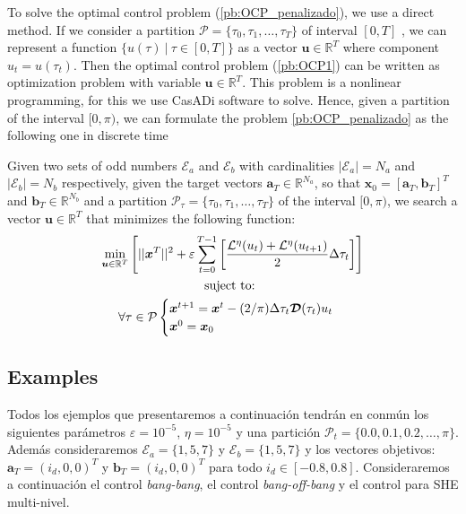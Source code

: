 \documentclass[twocolumn]{autart}    %
\begin{document}
To solve the optimal control problem (\ref{pb:OCP_penalizado}), we use a direct method. 
%
If we consider a partition $\mathcal{P} = \{\tau_0,\tau_1,\dots,\tau_{T}\}$ of interval $[0,T]$ , we can represent a function $\{ u(\tau) \ | \ \tau \in [0,T]\}$ as a vector $\bm{u} \in \mathbb{R}^{T}$ where component $u_t = u(\tau_t)$.  
%
Then the optimal control problem (\ref{pb:OCP1}) can be written as optimization problem with variable $\bm{u} \in \mathbb{R}^{T}$. This problem is a nonlinear programming, for this we use CasADi software to solve. 
%
Hence, given a partition of the interval $[0,\pi)$, we can formulate the problem \ref{pb:OCP_penalizado} as the following one in discrete time
\newline

\begin{problem}\label{pb:numOCP2}
Given two sets of odd numbers $\mathcal{E}_a$ and $\mathcal{E}_b$ with cardinalities $|\mathcal{E}_a| = N_a$ and $|\mathcal{E}_b| = N_b$ respectively, given the target vectors $\bm{a}_T  \in \mathbb{R}^{N_a}$, so that $\bm{x}_0 = [\bm{a}_T,\bm{b}_T]^T$ and $\bm{b}_T \in \mathbb{R}^{N_b}$ and a partition $\mathcal{P}_\tau = \{\tau_0,\tau_1,\dots,\tau_{T}\}$ of the interval $[0,\pi)$, we search a vector $\bm{u} \in \mathbb{R}^{T}$ that minimizes the following function:
\begin{gather}
        \min_{\bm{u} \in \mathbb{R}^{T} } 
        \Bigg[ 
        || \bm{x}^{T}||^2
        + \varepsilon  
        \sum_{t=0}^{T-1} 
            \bigg[ \frac{\mathcal{L}^\eta(u_{t}) + \mathcal{L}^\eta(u_{t+1})}{2}\Delta\tau_t \bigg]  \Bigg]  \\
        \notag \text{suject to: } \\
        \forall \tau \in \mathcal{P} \begin{cases}
            \bm{x}^{t+1} = \bm{x}^{t} - (2/\pi)\Delta \tau_t \bm{\mathcal{D}}(\tau_t)u_t \\
            \bm{x}^0 = \bm{x}_0
        \end{cases} 
\end{gather}
\end{problem}

\subsection{Examples}

Todos los ejemplos que presentaremos a continuación tendrán en conmún los siguientes parámetros $\varepsilon = 10^{-5}$, $\eta = 10^{-5}$ y una partición $\mathcal{P}_t = \{0.0 , 0.1, 0.2 ,\dots,\pi\}$. Además consideraremos $\mathcal{E}_a = \{1,5,7\}$ y  $\mathcal{E}_b = \{1,5,7\}$ y los vectores objetivos: $\bm{a}_T = (i_d,0,0)^T$ y $\bm{b}_T = (i_d,0,0)^T$ para todo $i_d \in [-0.8,0.8]$.  Consideraremos a continuación el control \emph{bang-bang}, el control \emph{bang-off-bang} y el control para SHE multi-nivel. 
\end{document}
